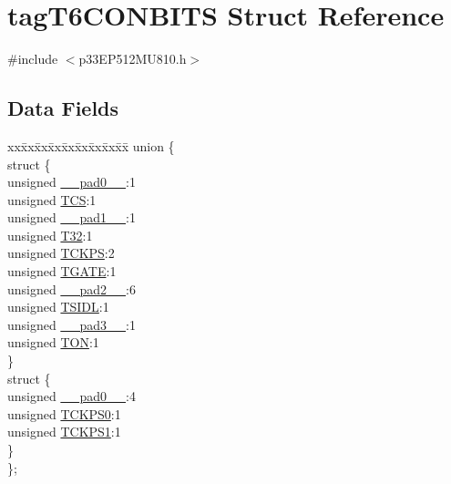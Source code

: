 \hypertarget{structtag_t6_c_o_n_b_i_t_s}{}\section{tag\+T6\+C\+O\+N\+B\+I\+TS Struct Reference}
\label{structtag_t6_c_o_n_b_i_t_s}


{\ttfamily \#include $<$p33\+E\+P512\+M\+U810.\+h$>$}

\subsection*{Data Fields}
\begin{DoxyCompactItemize}
\item 
\begin{tabbing}
xx\=xx\=xx\=xx\=xx\=xx\=xx\=xx\=xx\=\kill
union \{\\
\>struct \{\\
\>\>unsigned \hyperlink{structtag_t6_c_o_n_b_i_t_s_adf71f3d8410c1f1dbbc96680a92c49af}{\_\_pad0\_\_}:1\\
\>\>unsigned \hyperlink{structtag_t6_c_o_n_b_i_t_s_ab4daee3a10870ffba1c86d5020adb9b4}{TCS}:1\\
\>\>unsigned \hyperlink{structtag_t6_c_o_n_b_i_t_s_acaf2d0924a107ec6e8d2e31febaf66f9}{\_\_pad1\_\_}:1\\
\>\>unsigned \hyperlink{structtag_t6_c_o_n_b_i_t_s_a3bb4354090702842f0789980bb1cd45c}{T32}:1\\
\>\>unsigned \hyperlink{structtag_t6_c_o_n_b_i_t_s_a0d455d68434019feaabe9dfb64d75552}{TCKPS}:2\\
\>\>unsigned \hyperlink{structtag_t6_c_o_n_b_i_t_s_a35b6e4b591a8bd20e026168399eb0e6a}{TGATE}:1\\
\>\>unsigned \hyperlink{structtag_t6_c_o_n_b_i_t_s_a4d97cc5f7d51d22fc2bf3eab35c9cb7f}{\_\_pad2\_\_}:6\\
\>\>unsigned \hyperlink{structtag_t6_c_o_n_b_i_t_s_a4971b881615ef42703b5b78179fcda3d}{TSIDL}:1\\
\>\>unsigned \hyperlink{structtag_t6_c_o_n_b_i_t_s_ad7d7cee33e0c7f447abc4d171c628dd4}{\_\_pad3\_\_}:1\\
\>\>unsigned \hyperlink{structtag_t6_c_o_n_b_i_t_s_a8c2a094047d1019ce1c5b25ea8cff9b3}{TON}:1\\
\>\} \\
\>struct \{\\
\>\>unsigned \hyperlink{structtag_t6_c_o_n_b_i_t_s_adf71f3d8410c1f1dbbc96680a92c49af}{\_\_pad0\_\_}:4\\
\>\>unsigned \hyperlink{structtag_t6_c_o_n_b_i_t_s_a5cd4ef74604f5d88289a53f41cf38b7e}{TCKPS0}:1\\
\>\>unsigned \hyperlink{structtag_t6_c_o_n_b_i_t_s_ae190f2375c403c9fe8f5eb62a5bdf200}{TCKPS1}:1\\
\>\} \\
\}; \\

\end{tabbing}\end{DoxyCompactItemize}


